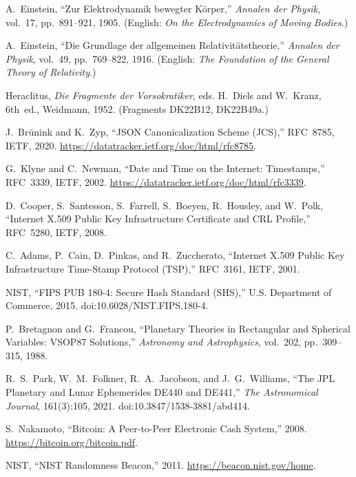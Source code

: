 \documentclass[11pt]{article}
\begin{document}
\begin{thebibliography}{12}

 A.~Einstein, ``Zur Elektrodynamik bewegter K\"orper,'' \emph{Annalen der Physik}, vol.~17, pp.~891--921, 1905. (English: \emph{On the Electrodynamics of Moving Bodies}.)

 A.~Einstein, ``Die Grundlage der allgemeinen Relativit\"atstheorie,'' \emph{Annalen der Physik}, vol.~49, pp.~769--822, 1916. (English: \emph{The Foundation of the General Theory of Relativity}.)

 Heraclitus, \emph{Die Fragmente der Vorsokratiker}, eds. H.~Diels and W.~Kranz, 6th~ed., Weidmann, 1952. (Fragments DK22B12, DK22B49a.)

 J.~Br{\"u}nink and K.~Zyp, ``JSON Canonicalization Scheme (JCS),'' RFC~8785, IETF, 2020. \url{https://datatracker.ietf.org/doc/html/rfc8785}.

 G.~Klyne and C.~Newman, ``Date and Time on the Internet: Timestamps,'' RFC~3339, IETF, 2002. \url{https://datatracker.ietf.org/doc/html/rfc3339}.

 D.~Cooper, S.~Santesson, S.~Farrell, S.~Boeyen, R.~Housley, and W.~Polk, ``Internet X.509 Public Key Infrastructure Certificate and CRL Profile,'' RFC~5280, IETF, 2008.

 C.~Adams, P.~Cain, D.~Pinkas, and R.~Zuccherato, ``Internet X.509 Public Key Infrastructure Time-Stamp Protocol (TSP),'' RFC~3161, IETF, 2001.

 NIST, ``FIPS PUB 180-4: Secure Hash Standard (SHS),'' U.S. Department of Commerce, 2015. doi:10.6028/NIST.FIPS.180-4.

 P.~Bretagnon and G.~Francou, ``Planetary Theories in Rectangular and Spherical Variables: VSOP87 Solutions,'' \emph{Astronomy and Astrophysics}, vol.~202, pp.~309--315, 1988.

 R.~S.~Park, W.~M.~Folkner, R.~A.~Jacobson, and J.~G.~Williams, ``The JPL Planetary and Lunar Ephemerides DE440 and DE441,'' \emph{The Astronomical Journal}, 161(3):105, 2021. doi:10.3847/1538-3881/abd414.

 S.~Nakamoto, ``Bitcoin: A Peer-to-Peer Electronic Cash System,'' 2008. \url{https://bitcoin.org/bitcoin.pdf}.

 NIST, ``NIST Randomness Beacon,'' 2011. \url{https://beacon.nist.gov/home}.
\end{thebibliography}
\end{document}
